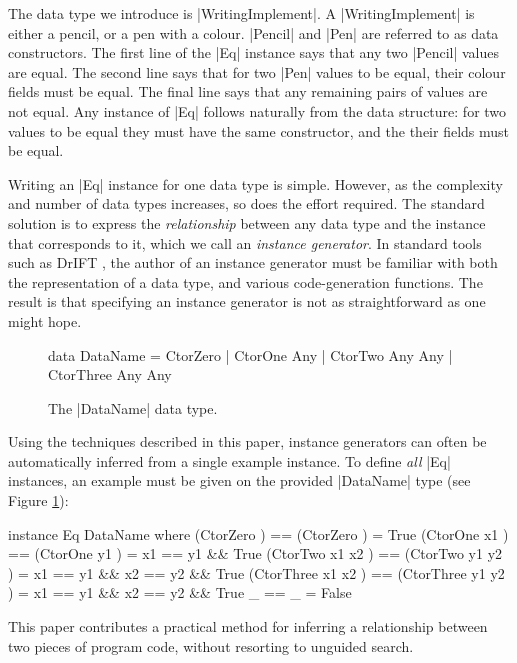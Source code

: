 \documentclass{llncs}
\begin{document}
The data type we introduce is |WritingImplement|. A |WritingImplement| is either a pencil, or a pen with a colour. |Pencil| and |Pen| are referred to as data constructors. The first line of the |Eq| instance says that any two |Pencil| values are equal. The second line says that for two |Pen| values to be equal, their colour fields must be equal. The final line says that any remaining pairs of values are not equal. Any instance of |Eq| follows naturally from the data structure: for two values to be equal they must have the same constructor, and the their fields must be equal.

Writing an |Eq| instance for one data type is simple. However, as the complexity and number of data types increases, so does the effort required. The standard solution is to express the \textit{relationship} between any data type and the instance that corresponds to it, which we call an \textit{instance generator}. In standard tools such as DrIFT \cite{drift}, the author of an instance generator must be familiar with both the representation of a data type, and various code-generation functions. The result is that specifying an instance generator is not as straightforward as one might hope.

\begin{figure}[tbp]
\begin{code}
data DataName  =  CtorZero
               |  CtorOne    Any
               |  CtorTwo    Any  Any
               |  CtorThree  Any  Any
\end{code}
\caption{The |DataName| data type.}
\label{fig:dataname}
\end{figure}

Using the techniques described in this paper, instance generators can often be automatically inferred from a single example instance. To define \textit{all} |Eq| instances, an example must be given on the provided |DataName| type (see Figure \ref{fig:dataname}):

\begin{code}
instance Eq DataName where
    (CtorZero          )  == (CtorZero          )  = True
    (CtorOne    x1     )  == (CtorOne    y1     )  = x1 == y1 && True
    (CtorTwo    x1 x2  )  == (CtorTwo    y1 y2  )  = x1 == y1 && x2 == y2 && True
    (CtorThree  x1 x2  )  == (CtorThree  y1 y2  )  = x1 == y1 && x2 == y2 && True
    _                     == _                     = False
\end{code}

This paper contributes a practical method for inferring a relationship between two pieces of program code, without resorting to unguided search.
\end{document}
